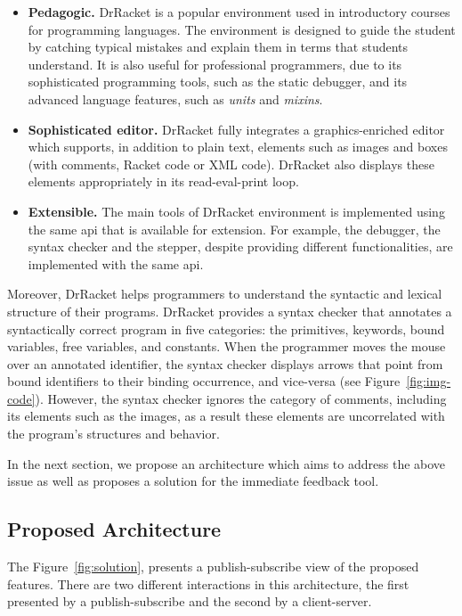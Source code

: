 \begin{itemize}
	\item \textbf{Pedagogic.} DrRacket is a popular environment used in introductory courses for programming languages. The environment is designed to guide the student by catching typical mistakes and explain them in terms that students understand. It is also useful for professional programmers, due to its sophisticated programming tools, such as the static debugger, and its advanced language features, such as \textit{units} and \textit{mixins}.

	\item \textbf{Sophisticated editor.} DrRacket fully integrates a graphics-enriched editor which supports, in addition to plain text, elements such as images and boxes (with comments, Racket code or XML code). DrRacket also displays these elements appropriately in its read-eval-print loop.

	\item \textbf{Extensible.} The main tools of DrRacket environment is implemented using the same \ac{api} that is available for extension. For example, the debugger, the syntax checker and the stepper, despite providing different functionalities, are implemented with the same \ac{api}.
\end{itemize}

Moreover, DrRacket helps programmers to understand the syntactic and lexical structure of their programs. DrRacket provides a syntax checker that annotates a syntactically correct program in five categories: the primitives, keywords, bound variables, free variables, and constants. When the programmer moves the mouse over an annotated identifier, the syntax checker displays arrows that point from bound identifiers to their binding occurrence, and vice-versa (see Figure~\ref{fig:img-code}). However, the syntax checker ignores the category of comments, including its elements such as the images, as a result these elements are uncorrelated with the program's structures and behavior.

In the next section, we propose an architecture which aims to address the above issue as well as proposes a solution for the immediate feedback tool.

\subsection{Proposed Architecture}

The Figure~\ref{fig:solution}, presents a publish-subscribe view of the proposed features. There are two different interactions in this architecture, the first presented by a publish-subscribe and the second by a client-server.

